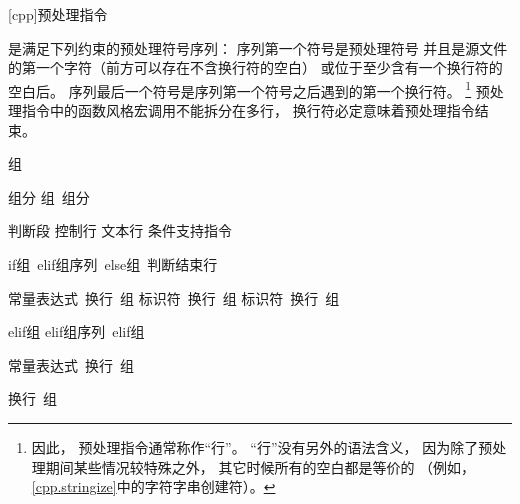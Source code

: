 [cpp]{预处理指令}%

%
%


\pnum
{}是满足下列约束的预处理符号序列：
序列第一个符号是预处理符号\tcode{\#}
并且是源文件的第一个字符（前方可以存在不含换行符的空白）
或位于至少含有一个换行符的空白后。
序列最后一个符号是序列第一个符号之后遇到的第一个换行符。
\footnote{因此，
	预处理指令通常称作``行''。
	``行''没有另外的语法含义，
	因为除了预处理期间某些情况较特殊之外，
	其它时候所有的空白都是等价的
	（例如，\ref{cpp.stringize}中的字符字串创建符\tcode{\#}）。}
预处理指令中的函数风格宏调用不能拆分在多行，
换行符必定意味着预处理指令结束。

\begin{bnf}
\br
    组\opt
\end{bnf}

\begin{bnf}
\br
    组分\br
    组~组分
\end{bnf}

\begin{bnf}
\br
    判断段\br
    控制行\br
    文本行\br
    \terminal{\#} 条件支持指令
\end{bnf}

\begin{bnf}
\br
    if组~elif组序列\opt~else组\opt~判断结束行
\end{bnf}

\begin{bnftab}
\br
\>\>\>常量表达式~换行~组\opt\br
\>\>\>标识符~换行~组\opt\br
\>\>\>标识符~换行~组\opt
\end{bnftab}

\begin{bnf}
\br
    elif组\br
    elif组序列~elif组
\end{bnf}

\begin{bnftab}
\br
\>\>\>常量表达式~换行~组\opt
\end{bnftab}

\begin{bnftab}
\br
\>\>\>换行~组\opt
\end{bnftab}

